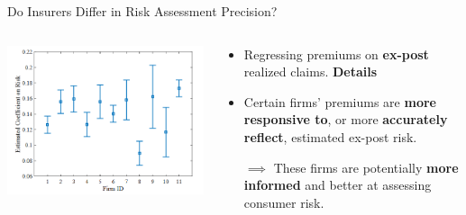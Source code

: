 \documentclass[10pt,aspectratio=169]{beamer}
\begin{document}
\begin{frame}{Do Insurers Differ in Risk Assessment Precision?}
    \begin{columns}[T] %
        
        \begin{column}{0.5\textwidth}
            \includegraphics[width=\linewidth]{Figures/Fig2.png} 
        \end{column}
        
        \begin{column}{0.5\textwidth}
            \begin{itemize}
                \item Regressing premiums on \textbf{ex-post} realized claims. \textbf{Details}
                
                \medskip
                \item Certain firms' premiums are \textbf{more responsive to}, or more \textbf{accurately reflect}, estimated ex-post risk.
                
                \medskip
                $\implies$ These firms are potentially \textbf{more informed} and better at assessing consumer risk.
            \end{itemize}
        \end{column}
    \end{columns}
\end{frame}
\end{document}
